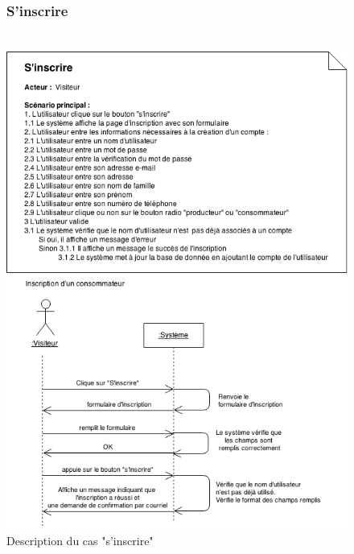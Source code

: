 \documentclass[12pt]{report}
\begin{document}
\begin{figure}[!h]
\centering
\subsubsection{S'inscrire~~~~~~~~~~~~~~~~~~~~~~~~~~~~~~~~~~~~~~~}
\includegraphics[width=1.\textwidth]{./ressources/desc_UC_inscrire.png}
\caption{Description du cas "s'inscrire"}
\end{figure}
\end{document}
